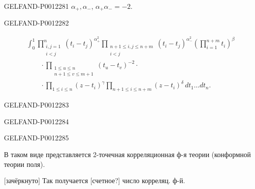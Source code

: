 \begin{GelfandAdjacentEvidence}{GELFAND-P001228}{1}
\(\alpha_+,\alpha_-\), \(\alpha_+\alpha_-=-2\).
\end{GelfandAdjacentEvidence}
\begin{GelfandAdjacentEvidence}{GELFAND-P001228}{2}

\begin{equation*}
\begin{aligned}
&\int_0^1
\prod_{\substack{i,j=1\\i<j}}^{n}(t_i-t_j)^{\alpha_+^2}
\prod_{\substack{n+1\le i,j\le n+m\\i<j}}(t_i-t_j)^{\alpha_-^2}
\left(\prod_{i=1}^{n+m}t_i\right)^\beta\\
&\qquad{}\cdot\prod_{\substack{1\le u\le n\\n+1\le v\le m+1}}(t_u-t_v)^{-2}\cdot\\
&\qquad{}\cdot\prod_{1\le i\le n}(z-t_i)^\gamma
\prod_{n+1\le i\le n+m}(z-t_i)^\delta\,dt_1\ldots dt_n.
\end{aligned}\tag{18}
\end{equation*}
\end{GelfandAdjacentEvidence}
\begin{GelfandAdjacentEvidence}{GELFAND-P001228}{3}

\end{GelfandAdjacentEvidence}
\begin{GelfandAdjacentEvidence}{GELFAND-P001228}{4}

\end{GelfandAdjacentEvidence}
\begin{GelfandAdjacentEvidence}{GELFAND-P001228}{5}


В таком виде представляется 2-точечная корреляционная ф-я теории (конформной теории поля).

[зачёркнуто] Так получается [счетное?] число корреляц. ф-й.
\end{GelfandAdjacentEvidence}
